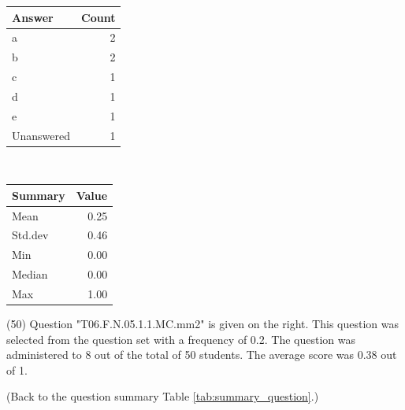 \documentclass[12pt,english,nohyper]{tufte-handout}\usepackage[]{graphicx}\usepackage[]{color}
\begin{document}
\begin{center}%
\begin{tabular}{lr}
  \hline
Answer & Count \\ 
  \hline
a &   2 \\ 
  b &   2 \\ 
  c &   1 \\ 
  d &   1 \\ 
  e &   1 \\ 
  Unanswered &   1 \\ 
   \hline
\end{tabular}
~~~~~~~~%
\begin{tabular}{lr}
  \hline
Summary & Value \\ 
  \hline
Mean & 0.25 \\ 
  Std.dev & 0.46 \\ 
  Min & 0.00 \\ 
  Median & 0.00 \\ 
  Max & 1.00 \\ 
   \hline
\end{tabular}
\end{center}\newpage{} (50) Question "T06.F.N.05.1.1.MC.mm2" is given on the right. This question was selected from the question set with a frequency of 0.2. The question was administered to 8 out of the total of 50 students. The average score was 0.38 out of 1.

 (Back to the question summary Table \ref{tab:summary_question}.)
\end{document}
